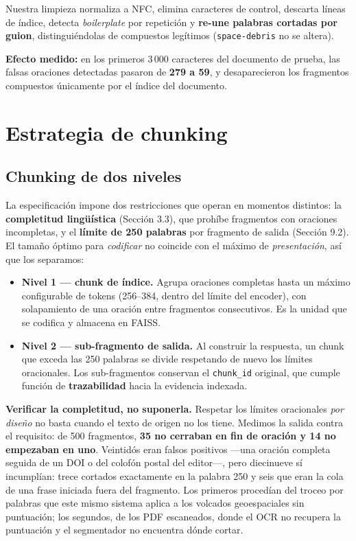 \documentclass[10pt,a4paper]{article}
\begin{document}
Nuestra limpieza normaliza a NFC, elimina caracteres de control, descarta líneas de índice,
detecta \emph{boilerplate} por repetición y \textbf{re-une palabras cortadas por guion},
distinguiéndolas de compuestos legítimos (\texttt{space-debris} no se altera).

\textbf{Efecto medido:} en los primeros 3\,000 caracteres del documento de prueba, las falsas
oraciones detectadas pasaron de \textbf{279 a 59}, y desaparecieron los fragmentos compuestos
únicamente por el índice del documento.

\section{Estrategia de chunking}

\subsection{Chunking de dos niveles}

La especificación impone dos restricciones que operan en momentos distintos: la
\textbf{completitud lingüística} (Sección 3.3), que prohíbe fragmentos con oraciones incompletas,
y el \textbf{límite de 250 palabras} por fragmento de salida (Sección 9.2). El tamaño óptimo para
\emph{codificar} no coincide con el máximo de \emph{presentación}, así que los separamos:

\begin{itemize}
\item \textbf{Nivel 1 — chunk de índice.} Agrupa oraciones completas hasta un máximo configurable
de tokens (256–384, dentro del límite del encoder), con solapamiento de una oración entre
fragmentos consecutivos. Es la unidad que se codifica y almacena en FAISS.
\item \textbf{Nivel 2 — sub-fragmento de salida.} Al construir la respuesta, un chunk que exceda
las 250 palabras se divide respetando de nuevo los límites oracionales. Los sub-fragmentos
conservan el \texttt{chunk\_id} original, que cumple función de \textbf{trazabilidad} hacia la
evidencia indexada.
\end{itemize}

\textbf{Verificar la completitud, no suponerla.} Respetar los límites oracionales \emph{por diseño}
no basta cuando el texto de origen no los tiene. Medimos la salida contra el requisito: de 500
fragmentos, \textbf{35 no cerraban en fin de oración y 14 no empezaban en uno}. Veintidós eran
falsos positivos —una oración completa seguida de un DOI o del colofón postal del editor—, pero
diecinueve sí incumplían: trece cortados exactamente en la palabra 250 y seis que eran la cola de
una frase iniciada fuera del fragmento. Los primeros procedían del troceo por palabras que este
mismo sistema aplica a los volcados geoespaciales sin puntuación; los segundos, de los PDF
escaneados, donde el OCR no recupera la puntuación y el segmentador no encuentra dónde cortar.
\end{document}
